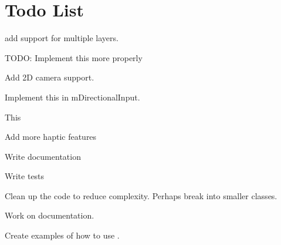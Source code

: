 \chapter{Todo List}
\hypertarget{todo}{}\label{todo}

\begin{DoxyRefList}
\item[Member \doxylink{class_atlas_1_1abstract_a7f6e5dc79241315ff8753e3ea3fbf3d2}{Atlas\+::abstract\texorpdfstring{$<$}{<} Console\+Sink \texorpdfstring{$>$}{>}\+::depth} ]\label{todo__todo000008}%
%
add support for multiple layers.  
\item[Member \doxylink{namespace_atlas_afa2a252b78c0821fed0a608c60cfd2f0}{Atlas\+::Default\+Physics\+Trace} (const char \texorpdfstring{$\ast$}{*}in\+FMT,...)]\label{todo__todo000009}%
%
TODO\+: Implement this more properly  
\item[Class \doxylink{class_atlas_1_1_game_camera}{Atlas\+::Game\+Camera} ]\label{todo__todo000011}%
%
Add 2D camera support.  
\item[Class \doxylink{class_atlas_1_1_game_camera_1_1_directional_input}{Atlas\+::Game\+Camera\+::Directional\+Input} ]\label{todo__todo000012}%
%
Implement this in m\+Directional\+Input.  
\item[Class \doxylink{class_atlas_1_1_localization_registry}{Atlas\+::Localization\+Registry} ]\label{todo__todo000007}%
%
This  
\item[File \doxylink{_common_8h}{Common.h} ]\label{todo__todo000001}%
%
Add more haptic features 
\item[File \doxylink{_file_system_registry_8h}{File\+System\+Registry.h} ]\label{todo__todo000005}%
%
Write documentation 



Write tests 



Clean up the code to reduce complexity. Perhaps break into smaller classes.  
\item[File \doxylink{_game_camera_8h}{Game\+Camera.h} ]\label{todo__todo000010}%
%
Work on documentation.  
\item[File \doxylink{_input_8h}{Input.h} ]\label{todo__todo000006}%
%
Create examples of how to use . 




\end{DoxyRefList}
